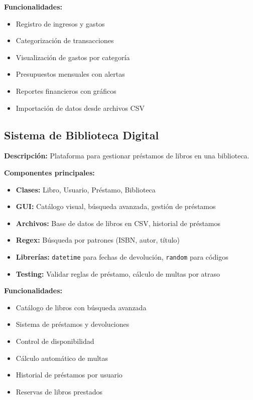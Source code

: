 \documentclass[12pt,a4paper]{article}
\begin{document}
\vspace{0.5em}
\textbf{Funcionalidades:}
\begin{itemize}
    \item Registro de ingresos y gastos
    \item Categorización de transacciones
    \item Visualización de gastos por categoría
    \item Presupuestos mensuales con alertas
    \item Reportes financieros con gráficos
    \item Importación de datos desde archivos CSV
\end{itemize}

\subsection{Sistema de Biblioteca Digital}

\textbf{Descripción:} Plataforma para gestionar préstamos de libros en una biblioteca.

\vspace{0.5em}
\textbf{Componentes principales:}
\begin{itemize}
    \item \textbf{Clases:} Libro, Usuario, Préstamo, Biblioteca
    \item \textbf{GUI:} Catálogo visual, búsqueda avanzada, gestión de préstamos
    \item \textbf{Archivos:} Base de datos de libros en CSV, historial de préstamos
    \item \textbf{Regex:} Búsqueda por patrones (ISBN, autor, título)
    \item \textbf{Librerías:} \texttt{datetime} para fechas de devolución, \texttt{random} para códigos
    \item \textbf{Testing:} Validar reglas de préstamo, cálculo de multas por atraso
\end{itemize}

\vspace{0.5em}
\textbf{Funcionalidades:}
\begin{itemize}
    \item Catálogo de libros con búsqueda avanzada
    \item Sistema de préstamos y devoluciones
    \item Control de disponibilidad
    \item Cálculo automático de multas
    \item Historial de préstamos por usuario
    \item Reservas de libros prestados
\end{itemize}
\end{document}
